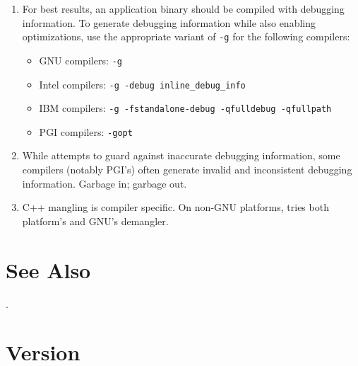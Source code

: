 \documentclass[english]{article}
\begin{document}
\begin{enumerate}

\item For best results, an application binary should be compiled with debugging information.
To generate debugging information while also enabling optimizations,
use the appropriate variant of \verb+-g+ for the following compilers:
\begin{itemize}
\item GNU compilers: \verb+-g+
\item Intel compilers: \verb+-g -debug inline_debug_info+
\item IBM compilers: \verb+-g -fstandalone-debug -qfulldebug -qfullpath+
\item PGI compilers: \verb+-gopt+
\end{itemize}

\item While  attempts to guard against inaccurate debugging information,
some compilers (notably PGI's) often generate invalid and inconsistent debugging information.
Garbage in; garbage out.

\item C++ mangling is compiler specific. On non-GNU platforms, 
tries both platform's and GNU's demangler.

\end{enumerate}




\section{See Also}

.

\section{Version}
\end{document}
